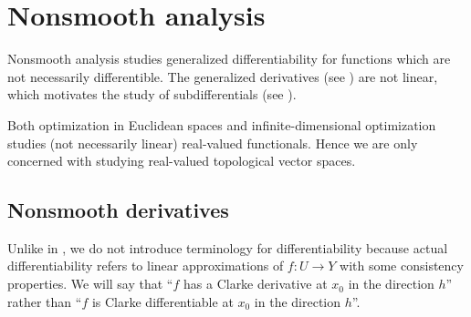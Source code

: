\section{Nonsmooth analysis}\label{sec:nonsmooth_analysis}

\begin{remark}\label{remark:nonsmooth_analysis}
  Nonsmooth analysis studies generalized differentiability for functions which are not necessarily differentible. The generalized derivatives (see ) are not linear, which motivates the study of subdifferentials (see ).

  Both optimization in Euclidean spaces and infinite-dimensional optimization studies (not necessarily linear) real-valued functionals. Hence we are only concerned with studying real-valued topological vector spaces.
\end{remark}

\subsection{Nonsmooth derivatives}\label{subsec:nonsmooth_derivatives}

\begin{remark}\label{remark:nonsmooth_differentiability}
  Unlike in , we do not introduce terminology for differentiability because actual differentiability refers to linear approximations of \( f: U \to Y \) with some consistency properties. We will say that \enquote{\( f \) has a Clarke derivative at \( x_0 \) in the direction \( h \)} rather than \enquote{\( f \) is Clarke differentiable at \( x_0 \) in the direction \( h \)}.
\end{remark}

